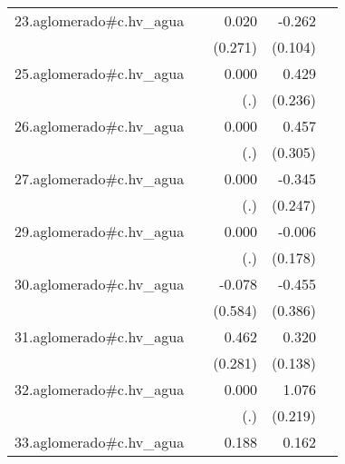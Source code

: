 {\begin{longtable}{l*{4}{D{.}{.}{-1}}}
\addlinespace
23.aglomerado#c.hv\_agua&                     &       0.020         &      -0.262\sym{*}  &                     \\
            &                     &     (0.271)         &     (0.104)         &                     \\
\addlinespace
25.aglomerado#c.hv\_agua&                     &       0.000         &       0.429         &                     \\
            &                     &         (.)         &     (0.236)         &                     \\
\addlinespace
26.aglomerado#c.hv\_agua&                     &       0.000         &       0.457         &                     \\
            &                     &         (.)         &     (0.305)         &                     \\
\addlinespace
27.aglomerado#c.hv\_agua&                     &       0.000         &      -0.345         &                     \\
            &                     &         (.)         &     (0.247)         &                     \\
\addlinespace
29.aglomerado#c.hv\_agua&                     &       0.000         &      -0.006         &                     \\
            &                     &         (.)         &     (0.178)         &                     \\
\addlinespace
30.aglomerado#c.hv\_agua&                     &      -0.078         &      -0.455         &                     \\
            &                     &     (0.584)         &     (0.386)         &                     \\
\addlinespace
31.aglomerado#c.hv\_agua&                     &       0.462         &       0.320\sym{*}  &                     \\
            &                     &     (0.281)         &     (0.138)         &                     \\
\addlinespace
32.aglomerado#c.hv\_agua&                     &       0.000         &       1.076\sym{***}&                     \\
            &                     &         (.)         &     (0.219)         &                     \\
\addlinespace
33.aglomerado#c.hv\_agua&                     &       0.188         &       0.162\sym{*}  &                     \\

\end{longtable}}
